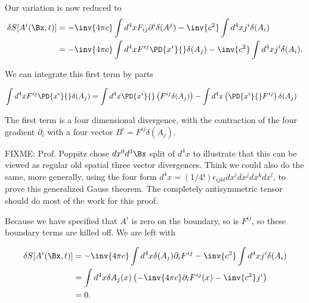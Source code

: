 Our variation is now reduced to
\begin{align*}
\delta S[A^i(\Bx, t)]
&= -\inv{4 \pi c} \int d^4 x F_{ij} \partial^i \delta(A^j) - \inv{c^2} \int d^4 x j^i \delta(A_i) \\
&= -\inv{4 \pi c} \int d^4 x F^{ij} \PD{x^i}{} \delta(A_j) - \inv{c^2} \int d^4 x j^i \delta(A_i).
\end{align*}

We can integrate this first term by parts

\begin{align*}
\int d^4 x F^{ij} \PD{x^i}{} \delta(A_j)
&=
\int d^4 x \PD{x^i}{} \left( F^{ij} \delta(A_j) \right)
-\int d^4 x \left( \PD{x^i}{} F^{ij} \right) \delta(A_j) 
\end{align*}

The first term is a four dimensional divergence, with the contraction of the four gradient $\partial_i$ with a four vector $B^i = F^{ij} \delta(A_j)$.

FIXME: Prof. Poppitz chose $dx^0 d^3 \Bx$ split of $d^4 x$ to illustrate that this can be viewed as regular old spatial three vector divergences.  Think we could also do the same, more generally, using the four form $d^4 x = (1/4!)\epsilon_{ijkl} dx^i dx^j dx^k dx^l$, to prove this generalized Gauss theorem.  The completely antisymmetric tensor should do most of the work for this proof.


Because we have specified that $A^i$ is zero on the boundary, so is $F^{ij}$, so these boundary terms are killed off.  We are left with

\begin{align*}
\delta S[A^i(\Bx, t)]
&= -\inv{4 \pi c} \int d^4 x \delta (A_j) \partial_i F^{ij} - \inv{c^2} \int d^4 x j^i \delta(A_i) \\
&=
\int d^4 x \delta A_j(x)
\left(
-\inv{4 \pi c} \partial_i F^{ij}(x) - \inv{c^2} j^i
\right)  \\
&= 0.
\end{align*}

